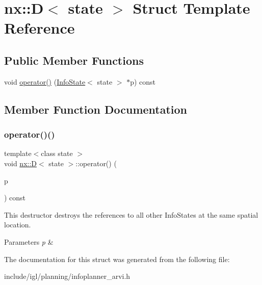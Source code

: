 \hypertarget{structnx_1_1D}{}\section{nx\+:\+:D$<$ state $>$ Struct Template Reference}
\label{structnx_1_1D}
\subsection*{Public Member Functions}
\begin{DoxyCompactItemize}
\item 
void \hyperlink{structnx_1_1D_af2c0c3653af6d84d9977ae110e1688cf}{operator()} (\hyperlink{structnx_1_1InfoState}{Info\+State}$<$ state $>$ $\ast$p) const
\end{DoxyCompactItemize}


\subsection{Member Function Documentation}
\mbox{\label{structnx_1_1D_af2c0c3653af6d84d9977ae110e1688cf}} 
\subsubsection{\texorpdfstring{operator()()}{operator()()}}
{\footnotesize\ttfamily template$<$class state $>$ \\
void \hyperlink{structnx_1_1D}{nx\+::D}$<$ state $>$\+::operator() (\begin{DoxyParamCaption}\item[{\hyperlink{structnx_1_1InfoState}{Info\+State}$<$ state $>$ $\ast$}]{p }\end{DoxyParamCaption}) const\hspace{0.3cm}{\ttfamily [inline]}}

This destructor destroys the references to all other Info\+States at the same spatial location. 
\begin{DoxyParams}{Parameters}
{\em p} & \\
\hline
\end{DoxyParams}


The documentation for this struct was generated from the following file\+:\begin{DoxyCompactItemize}
\item 
include/igl/planning/infoplanner\+\_\+arvi.\+h\end{DoxyCompactItemize}
